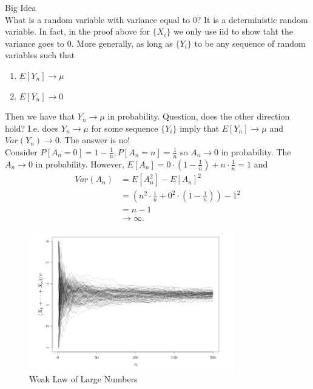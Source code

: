 \documentclass[a4paper]{article}
\begin{document}
\begin{note}{Big Idea}\\
  What is a random variable with variance equal to 0? It is a deterministic random variable. In fact, in the proof above for $\{X_i\}$ we only use iid to show taht the variance goes to 0. More generally, as long as $\{Y_i\}$ to be any sequence of random variables such that 
  \begin{enumerate}
    \item $E[Y_n] \to \mu$ 
    \item $E[Y_n] \to 0$
  \end{enumerate}
  Then we have that $Y_n \to \mu$ in probability. Question, does the other direction hold? I.e. does $Y_n \to \mu$ for some sequence  $\{Y_i\} $ imply that $E[Y_n] \to \mu$ and $Var(Y_n) \to 0$. The answer is no! \\


  Consider $P[A_n = 0] = 1 - \frac{1}{n}, P[A_n = n] = \frac{1}{n}$ so $A_n \to 0$ in probability. The $A_n \to 0$ in probability. However,  $E[A_n] = 0 \cdot (1-\frac{1}{n}) + n \cdot \frac{1}{n} = 1$ and
  \begin{align*}
    Var(A_n) &= E[A_n^{2}] - E[A_n]^{2} \\
             &= \left( n^{2} \cdot \frac{1}{n} + 0^{2} \cdot (1-\frac{1}{n}) \right) - 1^{2} \\
             &= n - 1 \\
             &\to \infty 
  .\end{align*}
\end{note}


\begin{figure}[h]
  \centering
  \includegraphics[width=0.8\textwidth]{assets/weak_law_large_numbers_diagram.png}
  \caption{Weak Law of Large Numbers}
  \label{fig:weak_law_large_numbers_diagram}
\end{figure}
\end{document}
